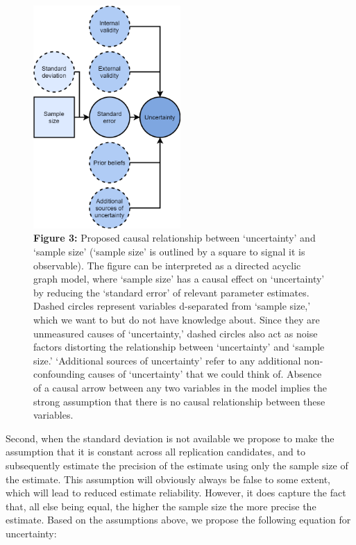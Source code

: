 \documentclass[
  english,
  man,floatsintext]{apa6}
\begin{document}
\begin{figure}
\centering
\includegraphics[width=0.5\textwidth,height=\textheight]{figure_3.png}
\caption{\textbf{Figure 3:} Proposed causal relationship between `uncertainty' and `sample size' (`sample size' is outlined by a square to signal it is observable). The figure can be interpreted as a directed acyclic graph model, where `sample size' has a causal effect on `uncertainty' by reducing the `standard error' of relevant parameter estimates. Dashed circles represent variables d-separated from `sample size,' which we want to but do not have knowledge about. Since they are unmeasured causes of `uncertainty,' dashed circles also act as noise factors distorting the relationship between `uncertainty' and `sample size.' `Additional sources of uncertainty' refer to any additional non-confounding causes of `uncertainty' that we could think of. Absence of a causal arrow between any two variables in the model implies the strong assumption that there is no causal relationship between these variables. \label{fig:3}}
\end{figure}

Second, when the standard deviation is not available we propose to make the assumption that it is constant across all replication candidates, and to subsequently estimate the precision of the estimate using only the sample size of the estimate. This assumption will obviously always be false to some extent, which will lead to reduced estimate reliability. However, it does capture the fact that, all else being equal, the higher the sample size the more precise the estimate. Based on the assumptions above, we propose the following equation for uncertainty:
\end{document}
